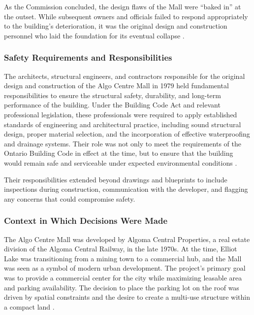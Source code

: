 \documentclass[12pt]{article}
\begin{document}
As the Commission concluded, the design flaws of the Mall were “baked in” at the outset. While subsequent owners and officials failed to respond appropriately to the building’s deterioration, it was the original design and construction personnel who laid the foundation for its eventual collapse \cite[66-70]{AlgoLakeReport1}.

\subsubsection*{Safety Requirements and Responsibilities}

The architects, structural engineers, and contractors responsible for the original design and construction of the Algo Centre Mall in 1979 held fundamental responsibilities to ensure the structural safety, durability, and long-term performance of the building. Under the Building Code Act and relevant professional legislation, these professionals were required to apply established standards of engineering and architectural practice, including sound structural design, proper material selection, and the incorporation of effective waterproofing and drainage systems. Their role was not only to meet the requirements of the Ontario Building Code in effect at the time, but to ensure that the building would remain safe and serviceable under expected environmental conditions \cite[p66–70]{AlgoLakeReport1}.

Their responsibilities extended beyond drawings and blueprints to include inspections during construction, communication with the developer, and flagging any concerns that could compromise safety.

\subsubsection*{Context in Which Decisions Were Made}

The Algo Centre Mall was developed by Algoma Central Properties, a real estate division of the Algoma Central Railway, in the late 1970s. At the time, Elliot Lake was transitioning from a mining town to a commercial hub, and the Mall was seen as a symbol of modern urban development. The project’s primary goal was to provide a commercial center for the city while maximizing leasable area and parking availability. The decision to place the parking lot on the roof was driven by spatial constraints and the desire to create a multi-use structure within a compact land \cite[p66–67]{AlgoLakeReport1}.
\end{document}
